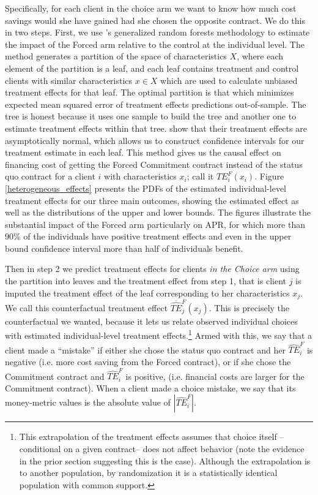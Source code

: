 \documentclass[oneside,11pt]{article}
\begin{document}
{Specifically, for each client in the choice arm we want to know how much cost savings would she have gained had she chosen the opposite contract. We do this in two steps.  First, we use  \cite{atheygrf}'s generalized random forests methodology to estimate the impact of the Forced arm relative to the control at the individual level.  The method generates a partition of the space of characteristics $X$, where each element of the partition is a leaf, and each leaf contains treatment and control clients with similar characteristics $x \in X$ which are used to calculate unbiased treatment effects for that leaf. The optimal partition is that which minimizes expected mean squared error of treatment effects predictions out-of-sample.  The tree is honest because it uses one sample to build the tree and another one to estimate treatment effects within that tree.  \cite{atheygrf} show that their treatment effects are asymptotically normal, which allows us to construct confidence intervals for our treatment estimate in each leaf. This method gives us the causal effect on financing cost of getting the Forced Commitment contract instead of the status quo contract for a client $i$ with characteristics $x_i$; call it $TE^{F}_{i}(x_i)$.   Figure \ref{heterogeneous_effects} presents the PDFs of the estimated individual-level treatment effects for our three main outcomes, showing the estimated effect as well as the distributions of the upper and lower bounds.  The figures illustrate the substantial impact of the Forced arm particularly on APR, for which more than 90\% of the individuals have positive treatment effects and even in the upper bound confidence interval more than half of individuals benefit.  

Then in step 2 we predict treatment effects for clients \textit{in the Choice arm} using the partition into leaves and the treatment effect from step 1, that is client $j$ is imputed the treatment effect of the leaf corresponding to her characteristics $x_j$. We call this counterfactual treatment effect $\widehat{TE}^{F}_{j}(x_j)$. This is precisely the counterfactual we wanted, because it lets us relate observed individual choices with estimated individual-level treatment effects.\footnote{This extrapolation of the treatment effects assumes that choice itself --conditional on a given contract-- does not affect behavior (note the evidence in the prior section suggesting this is the case).   Although the extrapolation is to another population, by randomization it is a statistically identical population with common support.} Armed with this, we say that a client made a ``mistake'' if either she chose the status quo contract and her $\widehat{TE}^{F}_{i}$ is negative (i.e. more cost saving from the Forced contract), or if she chose the Commitment contract and $\widehat{TE}^{F}_{i}$ is positive, (i.e.  financial costs are larger for the Commitment contract). When a client made a choice mistake, we say that its money-metric values is the absolute value of $|\widehat{TE}^{F}_{i}|$. 

}
\end{document}
